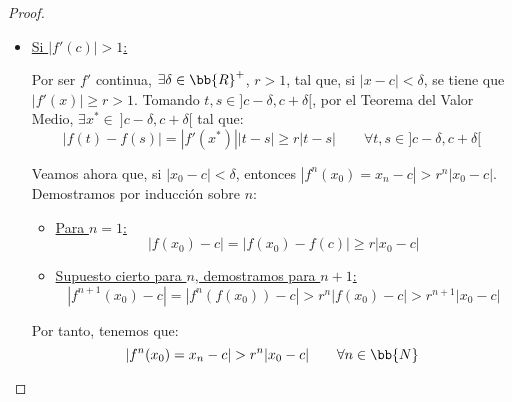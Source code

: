 \begin{proof}
\begin{itemize}
        Para ver la estabilidad de $c$, fijado $\veps\in \bb{R}^+$, tomamos $\wt{\delta}=\min \{\delta,\veps\}$. Tenemos entonces que, tomando $|x_0-c|<\wt{\delta}\leq \delta$, entonces:
        \begin{equation*}
            |f^n(x_0)=x_n -c|<r^{n}\wt{\delta} < \wt{\delta}  \leq\veps
        \end{equation*}
        Por tanto, $c$ es estable. Además, como $r<1$, tomando límite tenemos que:
        \begin{equation*}
            0\leq \lim_{n\to \infty} |x_n-c| \leq \lim_{n\to \infty}r^{n}\delta = 0
        \end{equation*}
        de lo que se deduce que $\lim\limits_{n\to \infty}x_n = c$, deduciendo entonces que es un atractor local. Por tanto, hemos concluido que $c$ es asintóticamente estable localmente.

            \item \ul{Si $|f'(c)|>1$:} 
            
            Por ser $f'$ continua, $\exists \delta\in \bb{R}^+$, $r>1$, tal que, si $|x-c|<\delta$, se tiene que $|f'(x)|\geq r >1$. Tomando $t,s\in ]c-\delta, c+\delta[$, por el Teorema del Valor Medio, $\exists x^\ast \in~]c-\delta, c+\delta[$ tal que:
        \begin{equation*}
            |f(t)-f(s)| = |f'(x^\ast)||t-s| \geq r|t-s| \qquad \forall t,s\in ]c-\delta, c+\delta[
        \end{equation*}

        Veamos ahora que, si $|x_0-c|<\delta$, entonces $|f^n(x_0)=x_n -c|>r^n  |x_0-c|$. Demostramos por inducción sobre $n$:
        \begin{itemize}
            \item \ul{Para $n=1$:}
            \begin{equation*}
                |f(x_0) - c| = |f(x_0)-f(c)|\geq r|x_0-c|
            \end{equation*}

            \item \ul{Supuesto cierto para $n$, demostramos para $n+1$:}
            \begin{equation*}
                |f^{n+1}(x_0) - c| = |f^n(f(x_0))-c|> r^n|f(x_0)-c|>r^{n+1}|x_0-c|
            \end{equation*}
        \end{itemize}

        Por tanto, tenemos que:
        \begin{equation*}
            |f^n(x_0)=x_n -c|>r^n  |x_0-c| \qquad \forall n\in \bb{N}
        \end{equation*}


\end{itemize}
\end{proof}
